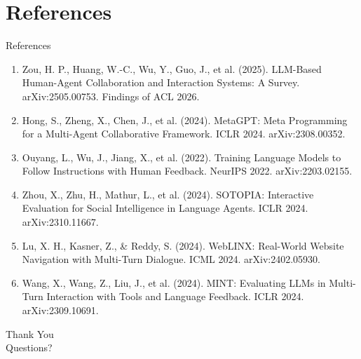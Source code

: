 \documentclass[10pt]{beamer}
\begin{document}
\section{References}
\begin{frame}[allowframebreaks]{References}
  \footnotesize
  \begin{enumerate}
    \item Zou, H. P., Huang, W.-C., Wu, Y., Guo, J., et al. (2025). LLM-Based Human-Agent Collaboration and Interaction Systems: A Survey. arXiv:2505.00753. Findings of ACL 2026.
    \item Hong, S., Zheng, X., Chen, J., et al. (2024). MetaGPT: Meta Programming for a Multi-Agent Collaborative Framework. ICLR 2024. arXiv:2308.00352.
    \item Ouyang, L., Wu, J., Jiang, X., et al. (2022). Training Language Models to Follow Instructions with Human Feedback. NeurIPS 2022. arXiv:2203.02155.
    \item Zhou, X., Zhu, H., Mathur, L., et al. (2024). SOTOPIA: Interactive Evaluation for Social Intelligence in Language Agents. ICLR 2024. arXiv:2310.11667.
    \item Lu, X. H., Kasner, Z., \& Reddy, S. (2024). WebLINX: Real-World Website Navigation with Multi-Turn Dialogue. ICML 2024. arXiv:2402.05930.
    \item Wang, X., Wang, Z., Liu, J., et al. (2024). MINT: Evaluating LLMs in Multi-Turn Interaction with Tools and Language Feedback. ICLR 2024. arXiv:2309.10691.
  \end{enumerate}
\end{frame}
\begin{frame}[plain]
  \begin{center}
    {\Huge Thank You}\\[1em]
    {\large Questions?}
  \end{center}
\end{frame}
\end{document}
